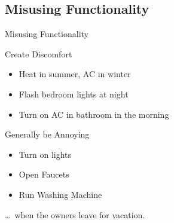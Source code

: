 \documentclass[11pt,t,usepdftitle=false,aspectratio=169]{beamer}
\begin{document}
\subsection{Misusing Functionality}
\begin{frame}{Misusing Functionality}
	\begin{block}{Create Discomfort}
		\begin{itemize}
			\item Heat in summer, AC in winter
			\item Flash bedroom lights at night
			\item Turn on AC in bathroom in the morning
		\end{itemize}
	\end{block}
	\begin{block}{Generally be Annoying}
		\begin{itemize}
			\item Turn on lights
			\item Open Faucets
			\item Run Washing Machine
		\end{itemize}
		\pause{}
		\dots~when the owners leave for vacation.
	\end{block}
\end{frame}
\end{document}
